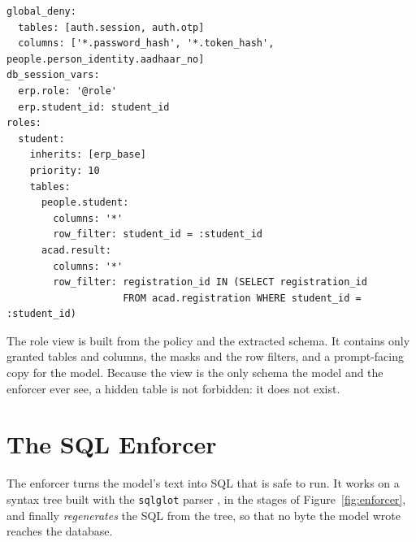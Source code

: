 \begin{lstlisting}[caption={Excerpt of the ERP policy (student role). Row filters use placeholders bound from the user's identity.}, label={lst:policy}]
global_deny:
  tables: [auth.session, auth.otp]
  columns: ['*.password_hash', '*.token_hash', people.person_identity.aadhaar_no]
db_session_vars:
  erp.role: '@role'
  erp.student_id: student_id
roles:
  student:
    inherits: [erp_base]
    priority: 10
    tables:
      people.student:
        columns: '*'
        row_filter: student_id = :student_id
      acad.result:
        columns: '*'
        row_filter: registration_id IN (SELECT registration_id
                    FROM acad.registration WHERE student_id = :student_id)
\end{lstlisting}

The role view is built from the policy and the extracted schema. It contains only granted tables and
columns, the masks and the row filters, and a prompt-facing copy for the model. Because the view is the
only schema the model and the enforcer ever see, a hidden table is not forbidden: it does not exist.

\section{The SQL Enforcer}
\label{sec:enforcer}

The enforcer turns the model's text into SQL that is safe to run. It works on a syntax tree built with the
\texttt{sqlglot} parser \citep{sqlglot}, in the stages of Figure~\ref{fig:enforcer}, and finally
\emph{regenerates} the SQL from the tree, so that no byte the model wrote reaches the database.

